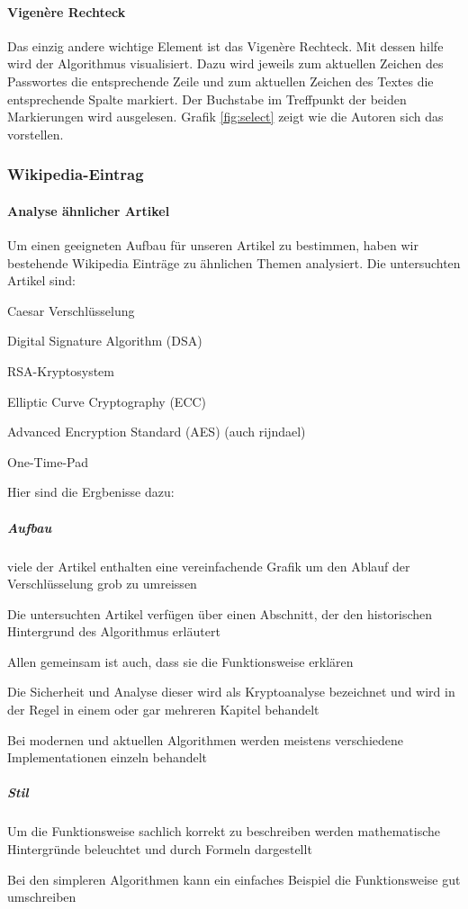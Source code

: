 \documentclass[11pt,paper=a4,final]{scrartcl}
\begin{document}
\paragraph{Vigen\`ere Rechteck}
Das einzig andere wichtige Element ist das Vigen\`ere Rechteck. Mit dessen hilfe
wird der Algorithmus visualisiert. Dazu wird jeweils zum aktuellen Zeichen des
Passwortes die entsprechende Zeile und zum aktuellen Zeichen des Textes die
entsprechende Spalte markiert. Der Buchstabe im Treffpunkt der beiden
Markierungen wird ausgelesen. Grafik \ref{fig:select} \glqq {}
\grqq zeigt wie die Autoren sich das vorstellen.

\subsubsection{Wikipedia-Eintrag}
\paragraph{Analyse \"ahnlicher Artikel}
Um einen geeigneten Aufbau f\"ur unseren Artikel zu bestimmen, haben wir
bestehende Wikipedia Eintr\"age zu \"ahnlichen Themen analysiert. Die
untersuchten Artikel sind:
\begin{itemize*}
  \item Caesar Verschl\"usselung
  \item Digital Signature Algorithm (DSA)
  \item RSA-Kryptosystem 
  \item Elliptic Curve Cryptography (ECC)
  \item Advanced Encryption Standard (AES) (auch rijndael)
  \item One-Time-Pad
\end{itemize*}
Hier sind die Ergbenisse dazu:

\subparagraph{Aufbau}
\begin{itemize*}
  \item viele der Artikel enthalten eine vereinfachende Grafik um den Ablauf der
  Verschl\"usselung grob zu umreissen
  \item Die untersuchten Artikel verf\"ugen \"uber einen Abschnitt, der den
  historischen Hintergrund des Algorithmus erl\"autert
  \item Allen gemeinsam ist auch, dass sie die Funktionsweise erkl\"aren
  \item Die Sicherheit und Analyse dieser wird als Kryptoanalyse bezeichnet und
  wird in der Regel in einem oder gar mehreren Kapitel behandelt
  \item Bei modernen und aktuellen Algorithmen werden meistens verschiedene
  Implementationen einzeln behandelt
\end{itemize*}
\subparagraph{Stil}
\begin{itemize*}
  \item Um die Funktionsweise sachlich korrekt zu beschreiben werden
  mathematische Hintergr\"unde beleuchtet und durch Formeln dargestellt
  \item Bei den simpleren Algorithmen kann ein einfaches Beispiel die
  Funktionsweise gut umschreiben
\end{itemize*}
\end{document}
